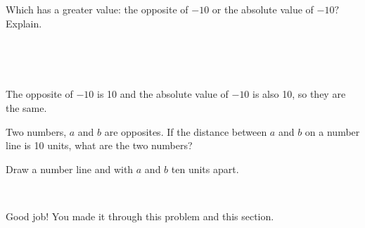\documentclass{ximera}[font=12pt]
\begin{document}
\begin{problem}
Which has a greater value: the opposite of $-10$ or the absolute value of $-10?$  Explain.

~ \\[2em]

\begin{multipleChoice}
\end{multipleChoice}

~ \\[2em]

\begin{feedback}
The opposite of $-10$ is 10 and the absolute value of $-10$ is also 10, so they are the same.
\end{feedback}

\end{problem}


\begin{problem}
Two numbers, $a$ and $b$ are opposites. If the distance between
$a$ and $b$ on a number line is 10 units, what are the two numbers?

\begin{multipleChoice}
\end{multipleChoice}

\begin{hint}
Draw a number line and with $a$ and $b$ ten units apart.
\end{hint}

~ \\[2em]

\begin{feedback}
Good job!  You made it through this problem and this section.
\end{feedback}

\end{problem}
\end{document}
